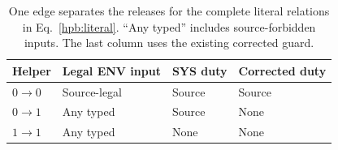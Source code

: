 \begin{table}[!ht]
\caption{One edge separates the releases for the complete literal relations
in Eq.~\eqref{hpb:literal}. ``Any typed'' includes source-forbidden inputs.
The last column uses the existing corrected guard.}
\label{tab:timing}\centering\small
\begin{tabular}{@{}llll@{}}\toprule
Helper & Legal ENV input & SYS duty & Corrected duty\\\midrule
$0\to0$ & Source-legal & Source & Source\\
$0\to1$ & Any typed & Source & None\\
$1\to1$ & Any typed & None & None\\\bottomrule
\end{tabular}
\end{table}
